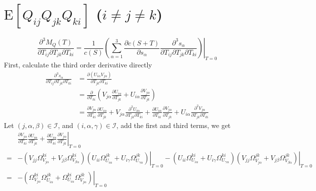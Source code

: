 \documentclass[10pt]{article}
\newcommand{\expect}[1]{\ensuremath{\mathrm{E}\left[ #1 \right]}}
\begin{document}
\section{$\expect{Q_{ij}Q_{jk}Q_{ki}}$ ($i\neq j\neq k$)}
\begin{equation*}
	\frac{\partial^3 M_Q(T)}{\partial T_{ij} \partial T_{jk} \partial T_{ki}} = \frac{1}{c(S)}\left.\left( \sum_{\alpha=1}^3 \frac{\partial c(S+T)}{\partial s_\alpha} \frac{\partial^3 s_\alpha}{\partial T_{ij} \partial T_{jk} \partial T_{ki}} \right)\right|_{T=0}
\end{equation*}
First, calculate the third order derivative directly
\begin{align} \label{eqn:3}
	\frac{\partial^3 s_\alpha}{\partial T_{ij} \partial T_{jk} \partial T_{ki}} &= \frac{\partial (U_{i\alpha}V_{j\alpha})}{\partial T_{jk} \partial T_{ki}} \nonumber \\
	&= \frac{\partial}{\partial T_{ki}} \left( V_{j\alpha}\frac{\partial U_{i\alpha}}{\partial T_{jk}} + U_{i\alpha}\frac{\partial V_{j\alpha}}{\partial T_{jk}} \right) \nonumber \\
	&= \frac{\partial V_{j\alpha}}{\partial T_{ki}}\frac{\partial U_{i\alpha}}{\partial T_{jk}} + V_{j\alpha}\frac{\partial^2 U_{i\alpha}}{\partial T_{jk} \partial T_{ki}} + \frac{\partial U_{i\alpha}}{\partial T_{ki}} \frac{\partial V_{j\alpha}}{\partial T_{jk}} + U_{i\alpha}\frac{\partial^2 V_{j\alpha}}{\partial T_{jk} \partial T_{ki}}
\end{align}
Let $(j,\alpha,\beta)\in\mathcal{I}$, and $(i,\alpha,\gamma)\in\mathcal{I}$, add the first and third terms, we get
\begin{align} \label{eqn:31}
	&\left. \frac{\partial V_{j\alpha}}{\partial T_{ki}}\frac{\partial U_{i\alpha}}{\partial T_{jk}} + \frac{\partial U_{i\alpha}}{\partial T_{ki}} \frac{\partial V_{j\alpha}}{\partial T_{jk}} \right|_{T=0} \nonumber \\
	= &\left. -\left( V_{jj}\Omega_{V_{j\alpha}}^{ki} + V_{j\beta}\Omega_{V_{\beta\alpha}}^{ki} \right)\left( U_{ii}\Omega_{U_{i\alpha}}^{jk} + U_{i\gamma}\Omega_{U_{\gamma\alpha}}^{jk} \right) \right|_{T=0} - \left. \left( U_{ii}\Omega_{U_{i\alpha}}^{ki} + U_{i\gamma}\Omega_{U_{\gamma\alpha}}^{ki} \right)\left( V_{jj}\Omega_{V_{j\alpha}}^{jk} + V_{j\beta}\Omega_{V_{\beta\alpha}}^{jk} \right)\right|_{T=0} \nonumber \\
	= &-\left.\left( \Omega_{V_{j\alpha}}^{ki}\Omega_{U_{i\alpha}}^{jk} + \Omega_{U_{i\alpha}}^{ki}\Omega_{V_{j\alpha}}^{jk} \right)\right|_{T=0}
\end{align}
\end{document}

